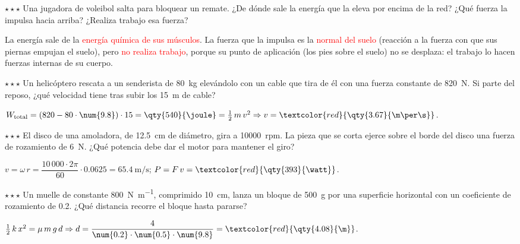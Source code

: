 \begin{exercise}
    \(\star\star\star\) Una jugadora de voleibol salta para bloquear un remate. ¿De dónde sale la energía que la eleva por encima de la
    red? ¿Qué fuerza la impulsa hacia arriba? ¿Realiza trabajo esa fuerza?
    \begin{solu}
        La energía sale de la \textcolor{red}{energía química de sus músculos}. La fuerza que la impulsa es la
        \textcolor{red}{normal del suelo} (reacción a la fuerza con que sus piernas empujan el suelo), pero
        \textcolor{red}{no realiza trabajo}, porque su punto de aplicación (los pies sobre el suelo) no se desplaza: el trabajo lo
        hacen fuerzas internas de su cuerpo.
    \end{solu}
\end{exercise}

\begin{exercise}
    \(\star\star\star\) Un helicóptero rescata a un senderista de \qty{80}{\kg} elevándolo con un cable que tira de él con una fuerza
    constante de \qty{820}{\newton}. Si parte del reposo, ¿qué velocidad tiene tras subir los \qty{15}{\m} de cable?
    \begin{solu}
        \(W_{\text{total}} = (820 - 80 \cdot \num{9.8}) \cdot 15 = \qty{540}{\joule} = \frac{1}{2}\,m\,v^2 \Rightarrow v = \textcolor{red}{\qty{3.67}{\m\per\s}}\).
    \end{solu}
\end{exercise}

\begin{exercise}
    \(\star\star\star\) El disco de una amoladora, de \qty{12.5}{\cm} de diámetro, gira a \qty{10000}{rpm}. La pieza que se corta ejerce
    sobre el borde del disco una fuerza de rozamiento de \qty{6}{\newton}. ¿Qué potencia debe dar el motor para mantener el giro?
    \begin{solu}
        \(v = \omega\,r = \dfrac{10\,000 \cdot 2\pi}{60} \cdot \num{0.0625} = \qty{65.4}{\m\per\s}\); \(P = F\,v = \textcolor{red}{\qty{393}{\watt}}\).
    \end{solu}
\end{exercise}

\begin{exercise}
    \(\star\star\star\) Un muelle de constante \qty{800}{\newton\per\m}, comprimido \qty{10}{\cm}, lanza un bloque de \qty{500}{\g} por
    una superficie horizontal con un coeficiente de rozamiento de \num{0.2}. ¿Qué distancia recorre el bloque hasta pararse?
    \begin{solu}
        \(\frac{1}{2}\,k\,x^2 = \mu\,m\,g\,d \Rightarrow d = \dfrac{4}{\num{0.2} \cdot \num{0.5} \cdot \num{9.8}} = \textcolor{red}{\qty{4.08}{\m}}\).
    \end{solu}
\end{exercise}


